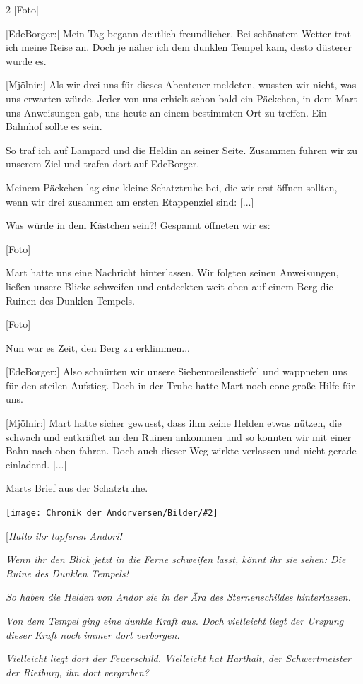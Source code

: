 \documentclass[10pt, a4paper, oneside]{book}
\newcommand{\bildmitts}[2][height=0.32\textwidth,width=0.48\textwidth,keepaspectratio]{%
    \begin{center}
        \texttt{[image: Chronik der Andorversen/Bilder/\#2]}
    \end{center}
}
\begin{document}
\begin{multicols}{2}
[Foto]

[EdeBorger:] Mein Tag begann deutlich freundlicher. Bei schönstem Wetter trat ich meine Reise an. Doch je näher ich dem dunklen Tempel kam, desto düsterer wurde es.

[Mjölnir:] Als wir drei uns für dieses Abenteuer meldeten, wussten wir nicht, was uns erwarten würde. Jeder von uns erhielt schon bald ein Päckchen, in dem Mart uns Anweisungen gab, uns heute an einem bestimmten Ort zu treffen. Ein Bahnhof sollte es sein.

So traf ich auf Lampard und die Heldin an seiner Seite. Zusammen fuhren wir zu unserem Ziel und trafen dort auf EdeBorger.

Meinem Päckchen lag eine kleine Schatztruhe bei, die wir erst öffnen sollten, wenn wir drei zusammen am ersten Etappenziel sind: [...]

Was würde in dem Kästchen sein?! Gespannt öffneten wir es:

[Foto]

Mart hatte uns eine Nachricht hinterlassen. Wir folgten seinen Anweisungen, ließen unsere Blicke schweifen und entdeckten weit oben auf einem Berg die Ruinen des Dunklen Tempels.

[Foto]

Nun war es Zeit, den Berg zu erklimmen...

[EdeBorger:] Also schnürten wir unsere Siebenmeilenstiefel und wappneten uns für den steilen Aufstieg. Doch in der Truhe hatte Mart noch eone große Hilfe für uns.

[Mjölnir:] Mart hatte sicher gewusst, dass ihm keine Helden etwas nützen, die schwach und entkräftet an den Ruinen ankommen und so konnten wir mit einer Bahn nach oben fahren. Doch auch dieser Weg wirkte verlassen und nicht gerade einladend. [...]

Marts Brief aus der Schatztruhe.

\bildmitts{Mart Brief.jpg}

[\textit{Hallo ihr tapferen Andori!}

\textit{Wenn ihr den Blick jetzt in die Ferne schweifen lasst, könnt ihr sie sehen: Die Ruine des Dunklen Tempels!}

\textit{So haben die Helden von Andor sie in der Ära des Sternenschildes hinterlassen.}

\textit{Von dem Tempel ging eine dunkle Kraft aus. Doch vielleicht liegt der Urspung dieser Kraft noch immer dort verborgen.}

\textit{Vielleicht liegt dort der Feuerschild. Vielleicht hat Harthalt, der Schwertmeister der Rietburg, ihn dort vergraben?}


\end{multicols}
\end{document}
